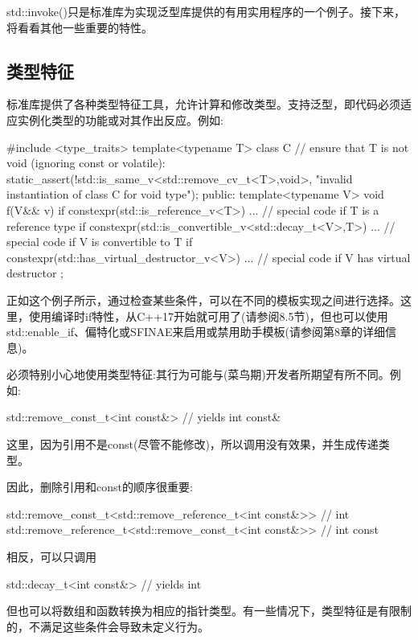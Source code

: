 
std::invoke()只是标准库为实现泛型库提供的有用实用程序的一个例子。接下来，将看看其他一些重要的特性。

\subsection{类型特征}

标准库提供了各种类型特征工具，允许计算和修改类型。支持泛型，即代码必须适应实例化类型的功能或对其作出反应。例如:

\begin{cpp}
#include <type_traits>
template<typename T>
class C
{
	// ensure that T is not void (ignoring const or volatile):
	static_assert(!std::is_same_v<std::remove_cv_t<T>,void>,
					"invalid instantiation of class C for void type");
public:
	template<typename V>
	void f(V&& v) {
		if constexpr(std::is_reference_v<T>) {
			... // special code if T is a reference type
		}
		if constexpr(std::is_convertible_v<std::decay_t<V>,T>) {
			... // special code if V is convertible to T
		}
		if constexpr(std::has_virtual_destructor_v<V>) {
			... // special code if V has virtual destructor
		}
	}
};
\end{cpp}

正如这个例子所示，通过检查某些条件，可以在不同的模板实现之间进行选择。这里，使用编译时if特性，从C++17开始就可用了(请参阅8.5节)，但也可以使用std::enable\_if、偏特化或SFINAE来启用或禁用助手模板(请参阅第8章的详细信息)。

必须特别小心地使用类型特征:其行为可能与(菜鸟期)开发者所期望有所不同。例如:

\begin{cpp}
std::remove_const_t<int const&> // yields int const&
\end{cpp}

这里，因为引用不是const(尽管不能修改)，所以调用没有效果，并生成传递类型。

因此，删除引用和const的顺序很重要:

\begin{cpp}
std::remove_const_t<std::remove_reference_t<int const&>> // int
std::remove_reference_t<std::remove_const_t<int const&>> // int const
\end{cpp}

相反，可以只调用

\begin{cpp}
std::decay_t<int const&> // yields int
\end{cpp}

但也可以将数组和函数转换为相应的指针类型。有一些情况下，类型特征是有限制的，不满足这些条件会导致未定义行为。

